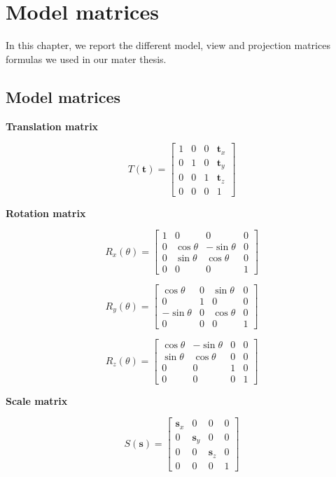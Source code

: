 \chapter{Model matrices}
\renewcommand{\arraystretch}{1}
\label{sec:matrices}
In this chapter, we report the different model, view and projection matrices formulas we used in our mater thesis.
\section{Model matrices}
\textbf{Translation matrix}

$$T(\mathbf{t}) = \left[\begin{array}{cccc}
1 & 0 & 0 & \mathbf{t}_x       \\
0 & 1 & 0 & \mathbf{t}_y       \\
0 & 0 & 1 & \mathbf{t}_z       \\
0 & 0 & 0 & 1
\end{array}\right]$$


\textbf{Rotation matrix}

$$R_x(\theta) = \left[\begin{array}{cccc}
1 & 0 & 0 & 0       \\
0 & \cos\theta & -\sin\theta & 0       \\
0 & \sin\theta & \cos\theta & 0      \\
0 & 0 & 0 & 1
\end{array}\right]$$

$$R_y(\theta) = \left[\begin{array}{cccc}
\cos\theta & 0 & \sin\theta & 0       \\
0 & 1 & 0 & 0       \\
-\sin\theta & 0 & \cos\theta & 0      \\
0 & 0 & 0 & 1
\end{array}\right]$$

$$R_z(\theta) = \left[\begin{array}{cccc}
\cos\theta & -\sin\theta & 0 & 0       \\
\sin\theta & \cos\theta & 0 & 0       \\
0 & 0 & 1 & 0      \\
0 & 0 & 0 & 1
\end{array}\right]$$

\textbf{Scale matrix}

$$S(\mathbf{s}) = \left[\begin{array}{cccc}
\mathbf{s}_x & 0 & 0 & 0       \\
0 & \mathbf{s}_y & 0 & 0       \\
0 & 0 & \mathbf{s}_z & 0      \\
0 & 0 & 0 & 1
\end{array}\right]$$

